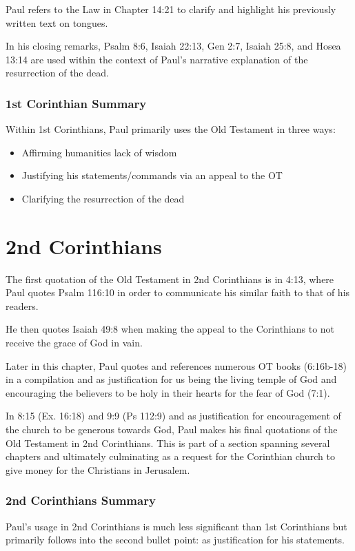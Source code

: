 \documentclass[12pt]{turabian-researchpaper}
\begin{document}
Paul refers to the Law in Chapter 14:21 to clarify and highlight his previously written text on tongues.

In his closing remarks, Psalm 8:6, Isaiah 22:13, Gen 2:7, Isaiah 25:8, and Hosea 13:14 are used within the context of Paul's narrative explanation of the resurrection of the dead.

\subsubsection{1st Corinthian Summary}

Within 1st Corinthians, Paul primarily uses the Old Testament in three ways: 
\begin{itemize}
\item Affirming humanities lack of wisdom
\item Justifying his statements/commands via an appeal to the OT
\item Clarifying the resurrection of the dead
\end{itemize}  

\section{2nd Corinthians}

The first quotation of the Old Testament in 2nd Corinthians is in 4:13, where Paul quotes Psalm 116:10 in order to communicate his similar faith to that of his readers.

He then quotes Isaiah 49:8 when making the appeal to the Corinthians to not receive the grace of God in vain. 

Later in this chapter, Paul quotes and references numerous OT books (6:16b-18) in a compilation and as justification for us being the living temple of God and encouraging the believers to be holy in their hearts for the fear of God (7:1).

In 8:15 (Ex. 16:18) and 9:9 (Ps 112:9) and as justification for encouragement of the church to be generous towards God, Paul makes his final quotations of the Old Testament in 2nd Corinthians. This is part of a section spanning several chapters and ultimately culminating as a request for the Corinthian church to give money for the Christians in Jerusalem.

\subsubsection{2nd Corinthians Summary}
Paul's usage in 2nd Corinthians is much less significant than 1st Corinthians but primarily follows into the second bullet point: as justification for his statements.
\end{document}
